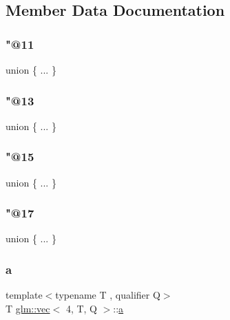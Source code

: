 \subsection{Member Data Documentation}
\mbox{\label{structglm_1_1vec_3_014_00_01_t_00_01_q_01_4_aa890ab635b49abc0ca73ec0a5d5b300d}} 
\subsubsection{\texorpdfstring{"@11}{@11}}
{\footnotesize\ttfamily union \{ ... \} }

\mbox{\label{structglm_1_1vec_3_014_00_01_t_00_01_q_01_4_aa4c6182cce44442db73c5fbd35786723}} 
\subsubsection{\texorpdfstring{"@13}{@13}}
{\footnotesize\ttfamily union \{ ... \} }

\mbox{\label{structglm_1_1vec_3_014_00_01_t_00_01_q_01_4_ace2b88b773cc3bf4381bfc9e8b793afb}} 
\subsubsection{\texorpdfstring{"@15}{@15}}
{\footnotesize\ttfamily union \{ ... \} }

\mbox{\label{structglm_1_1vec_3_014_00_01_t_00_01_q_01_4_afdc8bfb265955425d62d19e8056dd774}} 
\subsubsection{\texorpdfstring{"@17}{@17}}
{\footnotesize\ttfamily union \{ ... \} }

\mbox{\label{structglm_1_1vec_3_014_00_01_t_00_01_q_01_4_a2c591708237bac7d2047ff5af383a012}} 
\subsubsection{\texorpdfstring{a}{a}}
{\footnotesize\ttfamily template$<$typename T , qualifier Q$>$ \\
T \hyperlink{structglm_1_1vec}{glm\+::vec}$<$ 4, T, Q $>$\+::\hyperlink{_s_d_l__opengl__glext_8h_a3309789fc188587d666cda5ece79cf82}{a}}

